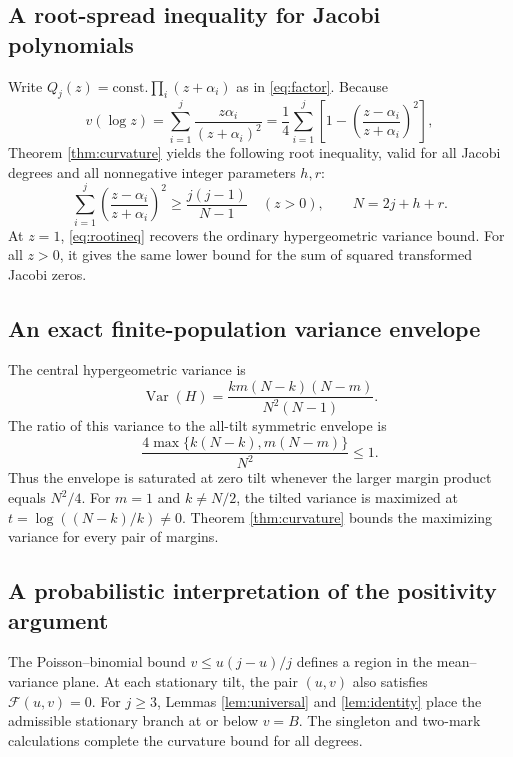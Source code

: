 \documentclass[11pt,a4paper]{article}
\DeclareMathOperator{\Var}{Var}\DeclareMathOperator{\Cov}{Cov}\DeclareMathOperator{\Hyp}{Hyp}\DeclareMathOperator{\Bern}{Bern}\DeclareMathOperator{\supp}{supp}\DeclareMathOperator{\artanh}{artanh}
\begin{document}
\subsection{A root-spread inequality for Jacobi polynomials}
Write $Q_j(z)=\text{const.}\prod_i(z+\alpha_i)$ as in \eqref{eq:factor}. Because
\[
 v(\log z)=\sum_{i=1}^j\frac{z\alpha_i}{(z+\alpha_i)^2}
 =\frac14\sum_{i=1}^j\left[1-\left(\frac{z-\alpha_i}{z+\alpha_i}\right)^2\right],
\]
Theorem \ref{thm:curvature} yields the following root inequality, valid for all Jacobi degrees and all nonnegative integer parameters $h,r$:
\begin{equation}\label{eq:rootineq}
 \boxed{\quad
 \sum_{i=1}^j\left(\frac{z-\alpha_i}{z+\alpha_i}\right)^2
 \ge\frac{j(j-1)}{N-1}
 \quad(z>0),\qquad N=2j+h+r.\quad}
\end{equation}
At $z=1$, \eqref{eq:rootineq} recovers the ordinary hypergeometric variance bound. For all $z>0$, it gives the same lower bound for the sum of squared transformed Jacobi zeros.

\subsection{An exact finite-population variance envelope}
The central hypergeometric variance is
\[
 \Var(H)=\frac{km(N-k)(N-m)}{N^2(N-1)}.
\]
The ratio of this variance to the all-tilt symmetric envelope is
\[
 \frac{4\max\{k(N-k),m(N-m)\}}{N^2}\le1.
\]
Thus the envelope is saturated at zero tilt whenever the larger margin product equals $N^2/4$. For $m=1$ and $k\ne N/2$, the tilted variance is maximized at $t=\log((N-k)/k)\ne0$. Theorem \ref{thm:curvature} bounds the maximizing variance for every pair of margins.

\subsection{A probabilistic interpretation of the positivity argument}
The Poisson--binomial bound $v\le u(j-u)/j$ defines a region in the mean--variance plane. At each stationary tilt, the pair $(u,v)$ also satisfies $\mathcal F(u,v)=0$. For $j\ge3$, Lemmas \ref{lem:universal} and \ref{lem:identity} place the admissible stationary branch at or below $v=B$. The singleton and two-mark calculations complete the curvature bound for all degrees.

\appendix



\end{document}
